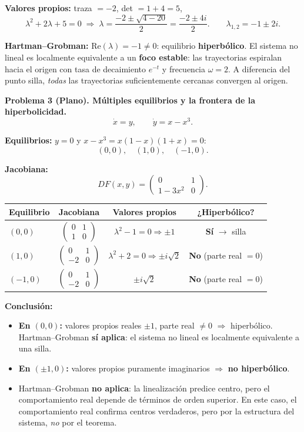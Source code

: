 \documentclass[12pt,letterpaper]{article}
\begin{document}
\textbf{Valores propios:} traza $=-2$, det $=1+4=5$,
\[
  \lambda^2+2\lambda+5=0 \;\Rightarrow\;
  \lambda = \frac{-2\pm\sqrt{4-20}}{2} = \frac{-2\pm4i}{2}.
  \qquad \boxed{\lambda_{1,2}=-1\pm2i.}
\]

\textbf{Hartman--Grobman:} $\text{Re}(\lambda)=-1\neq0$: equilibrio \textbf{hiperbólico}.
El sistema no lineal es localmente equivalente a un \textbf{foco estable}: las trayectorias
espiralan hacia el origen con tasa de decaimiento $e^{-t}$ y frecuencia $\omega=2$. A diferencia
del punto silla, \emph{todas} las trayectorias suficientemente cercanas convergen al origen.

\bigskip
\noindent\textbf{Problema 3 (Plano). Múltiples equilibrios y la frontera de la hiperbolicidad.}
\[
  \dot x = y, \qquad \dot y = x-x^3.
\]

\textbf{Equilibrios:} $y=0$ y $x-x^3=x(1-x)(1+x)=0$:
\[
  \boxed{(0,0),\quad (1,0),\quad (-1,0).}
\]

\textbf{Jacobiana:}
\[
  DF(x,y)=\begin{pmatrix}0&1\\1-3x^2&0\end{pmatrix}.
\]

\begin{table}[H]
\centering
\begin{tabular}{lccc}
\toprule
Equilibrio & Jacobiana & Valores propios & ¿Hiperbólico? \\
\midrule
$(0,0)$ & $\begin{pmatrix}0&1\\1&0\end{pmatrix}$ & $\lambda^2-1=0 \Rightarrow \pm1$ & \textbf{Sí} $\to$ silla \\[8pt]
$(1,0)$ & $\begin{pmatrix}0&1\\-2&0\end{pmatrix}$ & $\lambda^2+2=0 \Rightarrow \pm i\sqrt2$ & \textbf{No} (parte real $=0$) \\[8pt]
$(-1,0)$ & $\begin{pmatrix}0&1\\-2&0\end{pmatrix}$ & $\pm i\sqrt2$ & \textbf{No} (parte real $=0$) \\
\bottomrule
\end{tabular}
\end{table}

\textbf{Conclusión:}
\begin{itemize}
  \item \textbf{En $(0,0)$:} valores propios reales $\pm1$, parte real $\neq0$ $\Rightarrow$ hiperbólico.
    Hartman--Grobman \textbf{sí aplica}: el sistema no lineal es localmente equivalente a una silla.
  \item \textbf{En $(\pm1,0)$:} valores propios puramente imaginarios $\Rightarrow$ \textbf{no hiperbólico}.
  \item[] Hartman--Grobman \textbf{no aplica}: la linealización predice centro, pero el
    comportamiento real depende de términos de orden superior. En este caso, el comportamiento
    real confirma centros verdaderos, pero por la estructura del sistema, \emph{no} por el teorema.
\end{itemize}
\end{document}
